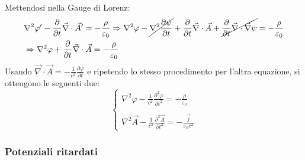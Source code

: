 \documentclass[a4paper]{scrartcl}
\numberwithin{equation}{subsection}
\theoremstyle{style1}
\begin{document}
Mettendosi nella Gauge di Lorenz:
\[
\begin{split}
	&\nabla ^2 \varphi'  - \frac{\partial }{\partial t} \vec{\nabla }\cdot \vec{A}' = - \frac{\rho }{\varepsilon _0}\Rightarrow \nabla ^2 \varphi  - \cancel{\nabla ^2 \frac{\partial \psi }{\partial t} } + \frac{\partial }{\partial t} \vec{\nabla }\cdot \vec{A}+\cancel{\frac{\partial }{\partial t} \vec{\nabla }\cdot \vec{\nabla }\psi}  = - \frac{\rho }{\varepsilon _0}\\
	&\Rightarrow \nabla ^2 \varphi  + \frac{\partial }{\partial t} \vec{\nabla }\cdot \vec{A}=-\frac{\rho }{\varepsilon _0}
\end{split}
\] 
Usando $\vec{\nabla }\cdot \vec{A}= - \frac{1}{c^2}\frac{\partial \varphi }{\partial t} $ e ripetendo lo stesso procedimento per l'altra equazione, si ottengono le seguenti due:
\begin{equation}
	\begin{cases}
	\displaystyle \nabla ^2 \varphi  - \frac{1}{c^2 }\frac{\partial ^2 \varphi }{\partial t^2} = - \frac{\rho }{\varepsilon _0}\\
	\\
	\displaystyle \nabla ^2 \vec{A}- \frac{1}{c^2}\frac{\partial ^2\vec{A}}{\partial t^2} = - \frac{\vec{j}}{\varepsilon _0c^2}
	\end{cases}
\end{equation}
\subsubsection{Potenziali ritardati}
\end{document}

